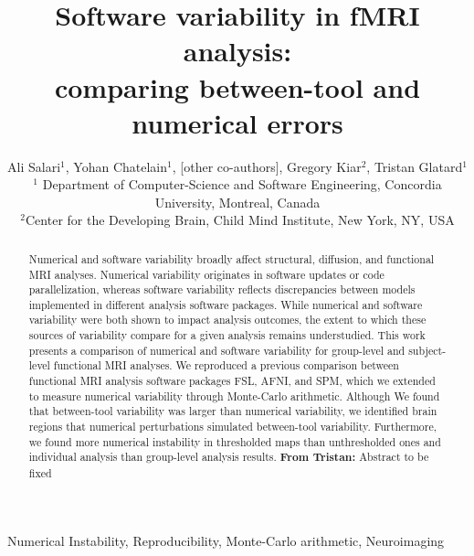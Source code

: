 \documentclass[conference]{IEEEtran}
\begin{document}
\newcommand{\fslspm}{FSL-SPM\xspace}
\newcommand{\fslafni}{FSL-AFNI\xspace}
\newcommand{\afnispm}{AFNI-SPM\xspace}
\newcommand{\tristan}[1]{\color{orange}\textbf{From Tristan:} #1\color{black}\xspace}
\newcommand{\ali}[2]{\color{green}\textbf{Ali:} #1\color{black}\xspace}
\newcommand{\discuss}[1]{\uwave{#1}}


\title{Software variability in fMRI analysis:\\ comparing between-tool and numerical errors}

\author{Ali Salari$^1$, Yohan Chatelain$^1$, [other co-authors], Gregory Kiar$^2$, Tristan Glatard$^1$ \\
$^1$ Department of Computer-Science and Software Engineering, Concordia University, Montreal, Canada\\
$^2$Center for the Developing Brain, Child Mind Institute, New York, NY, USA}

\maketitle
\begin{abstract}

Numerical and software variability broadly affect structural, diffusion, and functional MRI analyses. Numerical
variability originates in software updates or code
parallelization, whereas software variability reflects discrepancies between
models implemented in different analysis software packages. While numerical
and software variability were both shown to impact analysis outcomes, the
extent to which these sources of variability compare for a given
analysis remains understudied. This work presents a comparison of
numerical and software variability for group-level and subject-level functional MRI analyses.
We reproduced a previous comparison between functional MRI analysis
software packages FSL, AFNI, and SPM, which we extended to measure
numerical variability through Monte-Carlo arithmetic.
Although We found that between-tool variability was larger than numerical variability,
we identified brain regions that numerical perturbations simulated between-tool variability.
Furthermore, we found more numerical instability in thresholded maps than unthresholded ones
and individual analysis than group-level analysis results. \tristan{Abstract to be fixed}

\end{abstract}

\begin{IEEEkeywords}
  Numerical Instability, Reproducibility, Monte-Carlo arithmetic, Neuroimaging
\end{IEEEkeywords}
\end{document}
